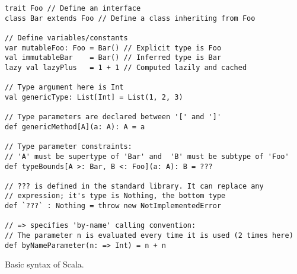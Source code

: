 \begin{algorithm}

\begin{verbatim}
trait Foo // Define an interface
class Bar extends Foo // Define a class inheriting from Foo

// Define variables/constants
var mutableFoo: Foo = Bar() // Explicit type is Foo
val immutableBar    = Bar() // Inferred type is Bar
lazy val lazyPlus   = 1 + 1 // Computed lazily and cached

// Type argument here is Int
val genericType: List[Int] = List(1, 2, 3)

// Type parameters are declared between '[' and ']'
def genericMethod[A](a: A): A = a

// Type parameter constraints:
// 'A' must be supertype of 'Bar' and  'B' must be subtype of 'Foo'
def typeBounds[A >: Bar, B <: Foo](a: A): B = ???

// ??? is defined in the standard library. It can replace any
// expression; it's type is Nothing, the bottom type
def `???` : Nothing = throw new NotImplementedError

// => specifies 'by-name' calling convention:
// The parameter n is evaluated every time it is used (2 times here)
def byNameParameter(n: => Int) = n + n
\end{verbatim}

\caption{Basic syntax of Scala. \label{scala:basics}}
\end{algorithm}